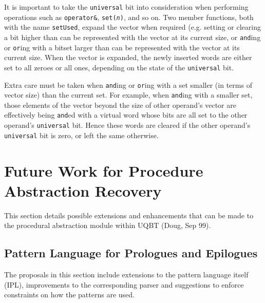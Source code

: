 It is important to take the \texttt{universal} bit into consideration when
performing operations such as \texttt{operator\&}, \texttt{set({\it n})},
and so on. Two member functions, both with the name \texttt{setUsed},
expand the vector when required (e.g. setting or clearing a bit higher than can
be represented with the vector at its current size, or \texttt{and}ing or
\texttt{or}ing with a bitset larger than can be represented with the vector
at its current size. When the vector is expanded, the newly inserted words
are either set to all zeroes or all ones, depending on the state of the
\texttt{universal} bit.

Extra care must be taken when \texttt{and}ing or
\texttt{or}ing with a set smaller (in terms of vector size) than the current
set. For example, when \texttt{and}ing with a smaller set, those elements of
the vector beyond the size of other operand's vector are effectively being
\texttt{and}ed with a virtual word whose bits are all set to the other
operand's \texttt{universal} bit. Hence these words are cleared if the other
operand's \texttt{universal} bit is zero, or left the same otherwise.


\section{Future Work for Procedure Abstraction Recovery}
\label{sec:future_work}

This section details possible extensions and enhancements that can be
made to the procedural abstraction module within UQBT (Doug, Sep 99).

\subsection{Pattern Language for Prologues and Epilogues}

The proposals in this section include extensions to the pattern
language itself (IPL), improvements to the corresponding parser
and suggestions to enforce constraints on how the patterns are used.

